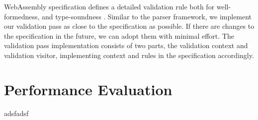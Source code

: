 WebAssembly specification defines a  detailed validation rule both for well-formedness, and type-soundness \cite{10.1145/3167082}. Similar to the parser framework, we implement our validation pass as close to the specification as possible. If there are changes to the specification in the future, we can adopt them with minimal effort. The validation pass implementation consists of two parts, the validation context and validation visitor, implementing context and rules in the specification accordingly. 

\section{Performance Evaluation}

adsfadsf
